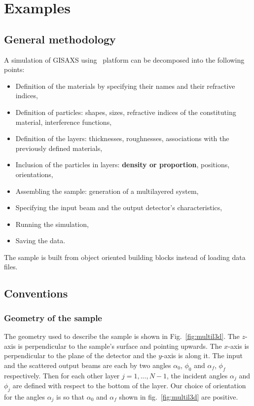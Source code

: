 \chapter{Examples} \label{Exampleschap}

\section{General methodology}
A simulation of GISAXS using \BornAgain\ platform can be decomposed into the following points:
\begin{itemize}
\item Definition of the materials by specifying their names and their
  refractive indices,
\item Definition of particles: shapes, sizes, refractive indices of
  the constituting material, interference functions,
\item Definition of the layers: thicknesses, roughnesses, associations with the previously defined
materials,
\item Inclusion of the particles in layers: \textbf{density or proportion}, positions, orientations, 
\item Assembling the sample: generation of a multilayered system,
\item Specifying the input beam and the output detector's
  characteristics,
\item Running the simulation,
\item Saving the data.
\end{itemize}

\noindent The sample is built from object oriented building blocks instead of loading data files.

\section{Conventions}

\subsection{Geometry of the sample}

\noindent The geometry used to describe the sample is shown in
Fig.~\ref{fig:multil3d}. The $z$-axis is perpendicular to the sample's
surface and pointing upwards. The $x$-axis  is perpendicular to the
plane of the detector and the $y$-axis is along it. The input and the scattered output beams are each by two angles
$\alpha_0$, $\phi_0$ and $\alpha_f$, $\phi_f$ respectively. Then for each other layer
$j=1,..., N-1$, the incident angles $\alpha_j$ and $\phi_j$  are defined with
respect to the bottom of the layer. Our choice of orientation for the
angles $\alpha_j$ is so that $\alpha_0$ and $\alpha_f$ shown in fig.~\ref{fig:multil3d}  are positive. \\


